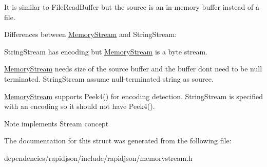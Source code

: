 It is similar to File\+Read\+Buffer but the source is an in-\/memory buffer instead of a file.

Differences between \hyperlink{struct_memory_stream}{Memory\+Stream} and String\+Stream\+:
\begin{DoxyEnumerate}
\item String\+Stream has encoding but \hyperlink{struct_memory_stream}{Memory\+Stream} is a byte stream.
\item \hyperlink{struct_memory_stream}{Memory\+Stream} needs size of the source buffer and the buffer don\textquotesingle{}t need to be null terminated. String\+Stream assume null-\/terminated string as source.
\item \hyperlink{struct_memory_stream}{Memory\+Stream} supports Peek4() for encoding detection. String\+Stream is specified with an encoding so it should not have Peek4(). \begin{DoxyNote}{Note}
implements Stream concept 
\end{DoxyNote}

\end{DoxyEnumerate}

The documentation for this struct was generated from the following file\+:\begin{DoxyCompactItemize}
\item 
dependencies/rapidjson/include/rapidjson/memorystream.\+h\end{DoxyCompactItemize}
